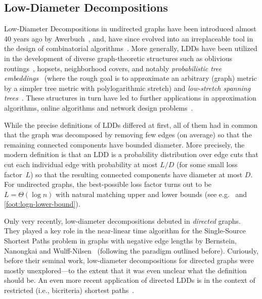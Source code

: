 \subsection{Low-Diameter Decompositions} \label{sec:intro:sec:ldd}
Low-Diameter Decompositions in undirected graphs have been introduced almost 40 years ago by Awerbuch~\cite{Awerbuch85}, and, have since evolved into an irreplaceable tool in the design of combinatorial algorithms~\cite{AwerbuchGLP89,AwerbuchP92,AwerbuchBCP92,LinialS93,Bartal96,BlellochGKMPT14,MillerPX13,PachockiRSTW18,ForsterG19,ChechikZ20,BernsteinGW20,ForsterGV21,BernsteinNW22}. More generally, LDDs have been utilized in the development of diverse graph-theoretic structures such as oblivious routings~\cite{ZuzicGYHS22}, hopsets, neighborhood covers, and notably \emph{probabilistic tree embeddings}~\cite{Bartal96,Bartal98,FakcharoenpholRT04} (where the rough goal is to approximate an arbitrary (graph) metric by a simpler tree metric with polylogarithmic stretch) and \emph{low-stretch spanning trees}~\cite{AlonKPW95,ElkinEST08,AbrahamBN08,KoutisMP11,AbrahamN19,AbrahamCEFN20}. These structures in turn have led to further applications in approximation algorithms, online algorithms and network design problems~\cite{Bartal96,BorodinY98,HaeuplerHZ21}.

While the precise definitions of LDDs differed at first, all of them had in common that the graph was decomposed by removing few edges (on average) so that the remaining connected components have bounded diameter. More precisely, the modern definition is that an LDD is a probability distribution over edge cuts that cut each individual edge with probability at most $L/D$ (for some small loss factor~$L$) so that the resulting connected components have diameter at most $D$. For undirected graphs, the best-possible loss factor turns out to be $L = \Theta(\log n)$ with natural matching upper and lower bounds (see e.g.~\cite{Bartal96,FakcharoenpholRT04} and \cref{foot:logn-lower-bound}).

Only very recently, low-diameter decompositions debuted in \emph{directed} graphs. They played a key role in the near-linear time algorithm for the Single-Source Shortest Paths problem in graphs with negative edge lengths by Bernstein, Nanongkai and Wulff-Nilsen~\cite{BernsteinNW22} (following the paradigm outlined before). Curiously, before their seminal work, low-diameter decompositions for directed graphs were mostly unexplored---to the extent that it was even unclear what the definition should be. An even more recent application of directed LDDs is in the context of restricted (i.e., bicriteria) shortest paths~\cite{AshvinkumarBK25}.


